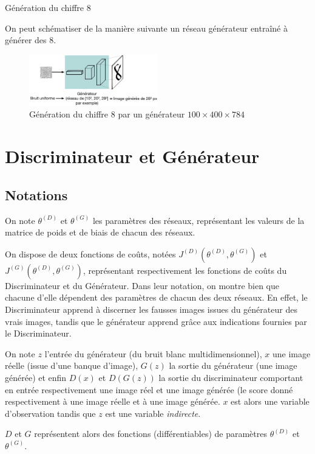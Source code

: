 \begin{example} Génération du chiffre 8

On peut schématiser de la manière suivante un réseau générateur entraîné à générer des 8.
\begin{figure}[h]
\begin{center}
\includegraphics[width=0.5\textwidth]{images/Colloque/GAN/generateur.png}\caption{Génération du chiffre 8 par un générateur $100\times 400\times 784$}
\end{center}
\end{figure} 
\end{example}
\section{Discriminateur et Générateur}
\subsection{Notations}
On note $\theta^{(D)}$ et $\theta^{(G)}$ les paramètres des réseaux, représentant les valeurs de la matrice de poids et de biais de chacun des réseaux.

On dispose de deux fonctions de coûts, notées $J^{(D)}(\theta^{(D)}, \theta^{(G)})$ et $J^{(G)}(\theta^{(D)}, \theta^{(G)})$, représentant respectivement les fonctions de coûts du Discriminateur et du Générateur. Dans leur notation, on montre bien que chacune d'elle dépendent des paramètres de chacun des deux réseaux. En effet, le Discriminateur apprend à discerner les fausses images issues du générateur des vrais images, tandis que le générateur apprend grâce aux indications fournies par le Discriminateur.

On note $z$ l'entrée du générateur (du bruit blanc multidimensionnel), $x$ une image réelle (issue d'une banque d'image), $G(z)$ la sortie du générateur (une image générée) et enfin $D(x)$ et $D(G(z))$ la sortie du discriminateur comportant en entrée respectivement une image réel et une image générée (le score donné respectivement à une image réelle et à une image générée. $x$ est alors une variable d'observation tandis que $z$ est une variable \textit{indirecte}.

$D$ et $G$ représentent alors des fonctions (différentiables) de paramètres $\theta^{(D)}$ et $\theta^{(G)}$.

